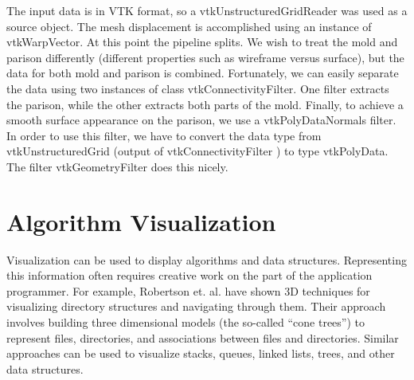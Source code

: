 \noindent The input data is in VTK format, so a vtkUnstructuredGridReader was used as a source object. The mesh displacement is accomplished using an instance of vtkWarpVector. At this point the pipeline splits. We wish to treat the mold and parison differently (different properties such as wireframe versus surface), but the data for both mold and parison is combined. Fortunately, we can easily separate the data using two instances of class vtkConnectivityFilter. One filter extracts the parison, while the other extracts both parts of the mold. Finally, to achieve a smooth surface appearance on the parison, we use a vtkPolyDataNormals filter. In order to use this filter, we have to convert the data type from vtkUnstructuredGrid (output of vtkConnectivityFilter ) to type vtkPolyData. The filter vtkGeometryFilter does this nicely.

\section{Algorithm Visualization}
Visualization can be used to display algorithms and data structures. Representing this information often requires creative work on the part of the application programmer. For example, Robertson et. al. \cite{Robertson91} have shown 3D techniques for visualizing directory structures and navigating through them. Their approach involves building three dimensional models (the so-called ``cone trees'') to represent files, directories, and associations between files and directories. Similar approaches can be used to visualize stacks, queues, linked lists, trees, and other data structures.

